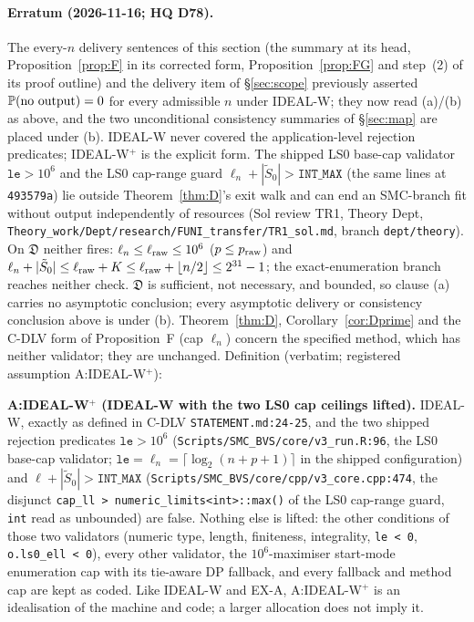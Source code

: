 \paragraph{Erratum (2026-11-16; HQ D78).} The every-$n$ delivery sentences of this section (the summary at its head, Proposition~\ref{prop:F} in its corrected form, Proposition~\ref{prop:FG} and step~(2) of its proof outline) and the delivery item of §\ref{sec:scope} previously asserted $\mathbb P(\text{no output})=0$ for every admissible $n$ under IDEAL-W; they now read (a)/(b) as above, and the two unconditional consistency summaries of §\ref{sec:map} are placed under (b). IDEAL-W never covered the application-level rejection predicates; IDEAL-W$^{+}$ is the explicit form. The shipped LS0 base-cap validator $\texttt{le}>10^6$  and the LS0 cap-range guard $\ell_n+|\tilde S_0|>\texttt{INT\_MAX}$  (the same lines at \texttt{493579a}) lie outside Theorem~\ref{thm:D}'s exit walk and can end an SMC-branch fit without output independently of resources (Sol review TR1, Theory Dept, \texttt{Theory\_work/Dept/research/FUNI\_transfer/TR1\_sol.md}, branch \texttt{dept/theory}). On $\mathfrak D$ neither fires: $\ell_n\le\ell_{\rm raw}\le10^6$ ($p\le p_{\rm raw}$) and $\ell_n+|\tilde S_0|\le\ell_{\rm raw}+K\le\ell_{\rm raw}+\lfloor n/2\rfloor\le2^{31}-1$; the exact-enumeration branch reaches neither check. $\mathfrak D$ is sufficient, not necessary, and bounded, so clause (a) carries no asymptotic conclusion; every asymptotic delivery or consistency conclusion above is under (b). Theorem~\ref{thm:D}, Corollary~\ref{cor:Dprime} and the C-DLV form of Proposition~F (cap $\ell_n$) concern the specified method, which has neither validator; they are unchanged. Definition (verbatim; registered assumption A:IDEAL-W$^{+}$):

\textbf{A:IDEAL-W$^{+}$ (IDEAL-W with the two LS0 cap ceilings lifted).} IDEAL-W, exactly as defined in C-DLV \texttt{STATEMENT.md:24-25}, and the two shipped rejection predicates $\texttt{le}>10^6$ (\texttt{Scripts/SMC\_BVS/core/v3\_run.R:96}, the LS0 base-cap validator; $\texttt{le}=\ell_n=\lceil\log_2(n+p+1)\rceil$ in the shipped configuration) and $\ell+|\tilde S_0|>\texttt{INT\_MAX}$ (\texttt{Scripts/SMC\_BVS/core/cpp/v3\_core.cpp:474}, the disjunct \texttt{cap\_ll > numeric\_limits<int>::max()} of the LS0 cap-range guard, \texttt{int} read as unbounded) are false. Nothing else is lifted: the other conditions of those two validators (numeric type, length, finiteness, integrality, \texttt{le < 0}, \texttt{o.ls0\_ell < 0}), every other validator, the $10^6$-maximiser start-mode enumeration cap with its tie-aware DP fallback, and every fallback and method cap are kept as coded. Like IDEAL-W and EX-A, A:IDEAL-W$^{+}$ is an idealisation of the machine and code; a larger allocation does not imply it.
